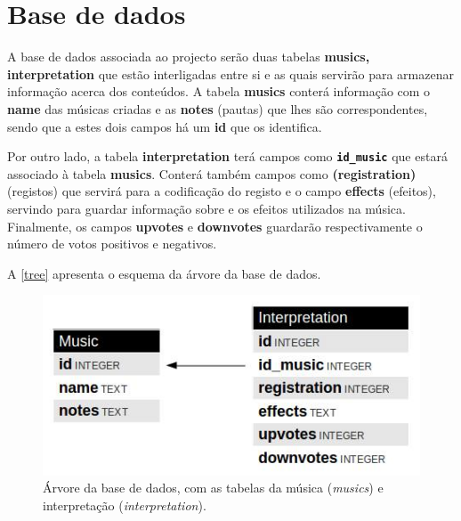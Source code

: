 \chapter{Base de dados}
\label{chap.base}

A base de dados associada ao projecto serão duas tabelas \textbf{musics, interpretation} que estão interligadas entre si e as quais servirão para armazenar informação acerca dos conteúdos.
A tabela \textbf{musics} conterá informação com o \textbf{name} das músicas criadas e as \textbf{notes} (pautas) que lhes são correspondentes, sendo que a estes dois campos há um \textbf{id} que os identifica.

Por outro lado, a tabela \textbf{interpretation} terá campos como
\textbf{\texttt{id\_music}} que estará associado à tabela \textbf{musics}. Conterá também campos como \textbf{(registration)} (registos) que servirá para a codificação do registo  e o campo \textbf{effects} (efeitos), servindo para guardar informação sobre e os efeitos utilizados na música.
Finalmente, os campos \textbf{upvotes} e \textbf{downvotes} guardarão respectivamente o número de votos positivos e negativos.

A \autoref{tree} apresenta o esquema da árvore da base de dados.

\begin{figure}[htp]
\centering
\includegraphics[width=\textwidth]{images/tree.jpg}
\caption{Árvore da base de dados, com as tabelas da música (\emph{musics}) e interpretação (\emph{interpretation}).}
\label{tree}
\end{figure}
